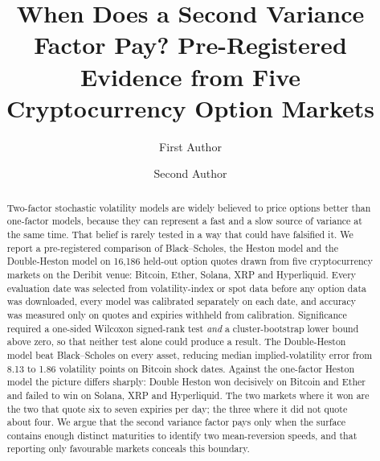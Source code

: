 \documentclass[runningheads]{llncs}
\begin{document}
\title{When Does a Second Variance Factor Pay? Pre-Registered Evidence
from Five Cryptocurrency Option Markets}


\author{First Author \and
Second Author}



\maketitle

\begin{abstract}
Two-factor stochastic volatility models are widely believed to price options
better than one-factor models, because they can represent a fast and a slow
source of variance at the same time. That belief is rarely tested in a way that
could have falsified it. We report a pre-registered comparison of
Black--Scholes, the Heston model and the Double-Heston model on 16,186 held-out option
quotes drawn from five cryptocurrency markets on the Deribit venue: Bitcoin,
Ether, Solana, XRP and Hyperliquid. Every evaluation date was selected from
volatility-index or spot data before any option data was downloaded, every
model was calibrated separately on each date, and accuracy was measured only on
quotes and expiries withheld from calibration. Significance required a
one-sided Wilcoxon signed-rank test \emph{and} a cluster-bootstrap lower bound
above zero, so that neither test alone could produce a result. The
Double-Heston model beat Black--Scholes on every asset, reducing median
implied-volatility error from 8.13 to 1.86 volatility points on Bitcoin shock
dates. Against the one-factor Heston model the picture differs sharply: Double
Heston won decisively on Bitcoin and Ether and failed to win on Solana, XRP and
Hyperliquid. The two markets where it won are the two that quote six to seven
expiries per day; the three where it did not quote about four. We argue that
the second variance factor pays only when the surface contains enough distinct
maturities to identify two mean-reversion speeds, and that reporting only
favourable markets conceals this boundary.

\end{abstract}
\end{document}
